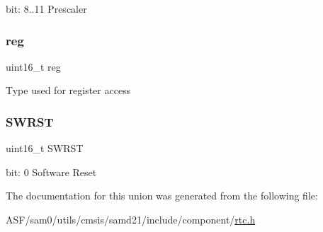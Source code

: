 bit\+: 8..11 Prescaler \mbox{\label{union_r_t_c___m_o_d_e2___c_t_r_l___type_a11760f5020019f4aa8cb02e694f7cc44}} 
\subsubsection{\texorpdfstring{reg}{reg}}
{\footnotesize\ttfamily uint16\+\_\+t reg}

Type used for register access \mbox{\label{union_r_t_c___m_o_d_e2___c_t_r_l___type_a4987fcca11694bd2ffae6a773a9bfc24}} 
\subsubsection{\texorpdfstring{SWRST}{SWRST}}
{\footnotesize\ttfamily uint16\+\_\+t S\+W\+R\+ST}

bit\+: 0 Software Reset 

The documentation for this union was generated from the following file\+:\begin{DoxyCompactItemize}
\item 
A\+S\+F/sam0/utils/cmsis/samd21/include/component/\mbox{\hyperlink{component_2rtc_8h}{rtc.\+h}}\end{DoxyCompactItemize}

